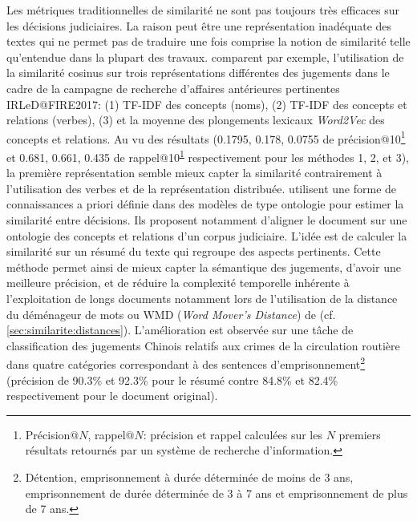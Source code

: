 Les métriques traditionnelles de similarité ne sont pas toujours très efficaces sur les décisions judiciaires. La raison peut être une représentation inadéquate des textes qui ne permet pas de traduire une fois comprise la notion de similarité telle qu'entendue dans la plupart des travaux. \citet{thenmozhi2017legalprecedretriev} comparent par exemple, l'utilisation de la similarité cosinus sur trois représentations différentes des jugements dans le cadre de la campagne de recherche d'affaires antérieures pertinentes  IRLeD@FIRE2017\citep{mandal2017IRLeD@FIRE2017}: (1) TF-IDF des concepts (noms), (2) TF-IDF des concepts et relations (verbes), (3) et la moyenne des plongements lexicaux \textit{Word2Vec} \citep{lemikolov2014word2vec} des concepts et relations. Au vu des résultats (0.1795, 0.178, 0.0755 de précision@10\footnote{\label{footnote:literature:PR_at_N} Précision@$N$, rappel@$N$: précision et rappel calculées sur les $N$ premiers résultats retournés par un système de recherche d'information.} et 0.681, 0.661, 0.435 de rappel@10\textsuperscript{\ref{footnote:literature:PR_at_N}} respectivement pour les méthodes 1, 2, et 3), la première représentation semble mieux capter la similarité contrairement à l'utilisation des verbes et de la représentation distribuée.  %
 \citet{ma2018wmdchinesecase} utilisent une forme de connaissances a priori définie dans des modèles de type ontologie pour estimer la similarité entre décisions. Ils proposent notamment d'aligner le document sur une ontologie des concepts et relations d'un corpus judiciaire. L'idée est de calculer la similarité sur un résumé du texte qui regroupe des aspects pertinents. Cette méthode permet ainsi de mieux capter la sémantique des jugements, d'avoir une meilleure précision, et de réduire la complexité temporelle inhérente à l'exploitation de longs documents notamment lors de l'utilisation de la \og distance du déménageur de mots \fg{} ou WMD (\textit{Word Mover's Distance}) de \citet{kusner2015wordmoverdist} (cf. \ref{sec:similarite:distances}). L'amélioration est observée sur une tâche de classification des jugements Chinois relatifs aux crimes de la circulation routière dans quatre catégories correspondant à des sentences d'emprisonnement\footnote{Détention, emprisonnement à durée déterminée de moins de 3 ans, emprisonnement de durée déterminée de 3 à 7 ans et emprisonnement de plus de 7 ans.} (précision de 90.3\% et 92.3\% pour le résumé contre 84.8\% et 82.4\% respectivement pour le document original). 

